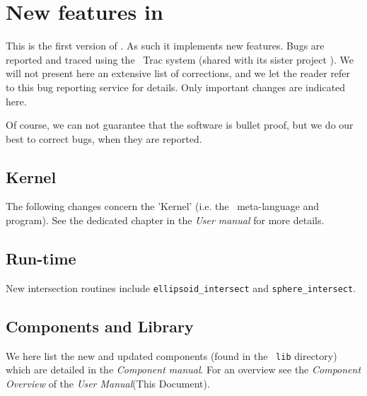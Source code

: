 
\chapter{New features in \MCX\ \version\ }
\label{c:changes}

This is the first version of \MCX. As such it implements new features. Bugs are
reported and traced using the \MCX\ Trac system \cite{mccode_trac_webpage}
(shared with its sister project \MCS). We will not present here an extensive
list of corrections, and we let the reader refer to this bug reporting service
for details. Only important changes are indicated here.

Of course, we can not guarantee that the software is bullet proof, but we do our best to correct bugs, when they are reported.


\section{Kernel}
\label{s:new-features:kernel}

The following changes concern the 'Kernel' (i.e. the \MCX\ meta-language and program). See the dedicated chapter in the {\it User manual} for more details.

\section{Run-time}
\label{s:new-features:run-time}
New intersection routines include \verb+ellipsoid_intersect+ and \verb+sphere_intersect+.


\section{Components and Library}
\label{s:new-features:components}
 
We here list the new and updated components (found in the \MCX\ \verb+lib+ directory)
which are detailed in the {\it Component manual}. For an overview see the {\it Component Overview} of the {\it User Manual}(This Document).
